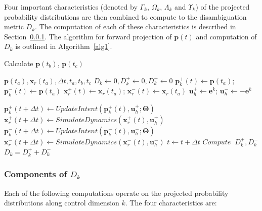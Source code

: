 Four important characteristics (denoted by $\Gamma_k$, $\Omega_k$, $\Lambda_k$ and $\Upsilon_k$) of the projected probability distributions are then combined to compute to the disambiguation metric $D_k$. The computation of each of these characteristics is described in Section~\ref{sssec:components}. The algorithm for forward projection of $\boldsymbol{p}(t)$ and computation of $D_k$ is outlined in Algorithm~\ref{alg1}.
\begin{algorithm}
	\caption{Calculate $\boldsymbol{p}(t_b)$, $\boldsymbol{p}(t_c)$}
	\label{alg1}
	\begin{algorithmic}
		\REQUIRE $\boldsymbol{p}(t_a), \boldsymbol{x}_r(t_a), \Delta t, t_a, t_b, t_c$
		\STATE $D_k \leftarrow 0,D_k^+ \leftarrow 0, D_k^- \leftarrow 0 $
		\STATE $\boldsymbol{p}_k^+(t) \leftarrow \boldsymbol{p}(t_a)$; $\boldsymbol{p}_k^-(t) \leftarrow \boldsymbol{p}(t_a)$
		\STATE $\boldsymbol{x}_r^+(t) \leftarrow \boldsymbol{x}_r(t_a)$; $\boldsymbol{x}_r^-(t) \leftarrow \boldsymbol{x}_r(t_a)$
		\STATE $\boldsymbol{u}_h^+ \leftarrow \boldsymbol{e}^k$; $\boldsymbol{u}_h^- \leftarrow -\boldsymbol{e}^k$
		
		\STATE $\boldsymbol{p}^+_k(t + \Delta t) \leftarrow UpdateIntent(\boldsymbol{p}^+_k(t), \boldsymbol{u}_h^+; \boldsymbol{\Theta})$
		\STATE $\boldsymbol{x}_r^+(t + \Delta t) \leftarrow SimulateDynamics(\boldsymbol{x}_r^+(t), \boldsymbol{u}_h^+)$
		\STATE $\boldsymbol{p}^-_k(t + \Delta t) \leftarrow UpdateIntent(\boldsymbol{p}^-_k(t), \boldsymbol{u}_h^-; \boldsymbol{\Theta})$
		\STATE $\boldsymbol{x}_r^-(t + \Delta t) \leftarrow SimulateDynamics(\boldsymbol{x}_r^-(t), \boldsymbol{u}_h^-)$
		\STATE $t \leftarrow t + \Delta t$
		    \ENDIF
		\ENDWHILE
		\STATE $Compute \;\;D_k^+, D_k^-$
		\STATE $D_k = D_k^+ + D_k^-$
		\ENDFOR
		
	\end{algorithmic}
\end{algorithm}

\subsubsection{Components of $D_k$}\label{sssec:components}
Each of the following computations operate on the projected probability distributions along control dimension $k$. The four characteristics are:

